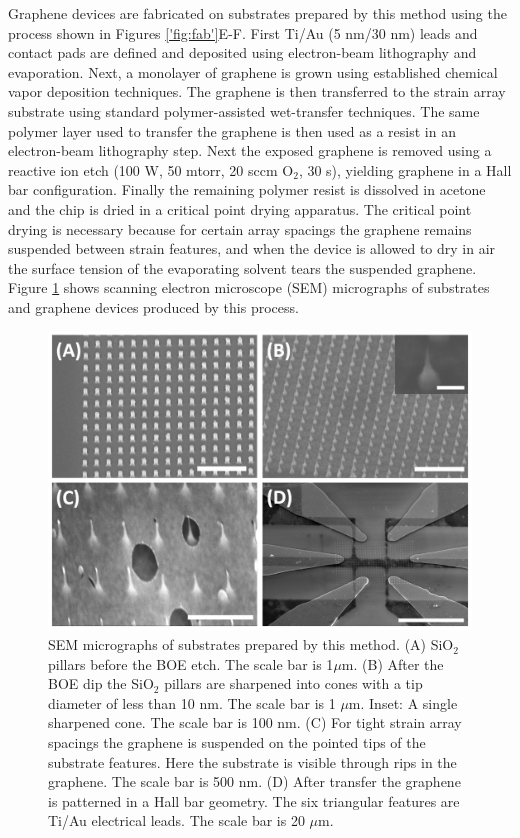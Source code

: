 \documentclass[edeposit,fullpage,draftthesis]{uiucthesis2009}
\begin{document}
            Graphene devices are fabricated on substrates prepared by this method using the process shown in Figures \ref{'fig:fab'}E-F. 
            First Ti/Au (5 nm/30 nm) leads and contact pads are defined and deposited using electron-beam lithography and evaporation. 
            Next, a monolayer of graphene is grown using established chemical vapor deposition techniques\cite{Li2009}. 
            The graphene is then transferred to the strain array substrate using standard polymer-assisted wet-transfer 
            techniques\cite{li2009transfer}. The same polymer layer used to transfer the graphene is then used as a 
            resist in an electron-beam lithography step. Next the exposed graphene is removed using a reactive ion etch 
            (100 W, 50 mtorr, 20 sccm O$_2$, 30 s), yielding graphene in a Hall bar configuration. Finally the remaining 
            polymer resist is dissolved in acetone and the chip is dried in a critical point drying apparatus. 
            The critical point drying is necessary because for certain array spacings the graphene remains suspended between
            strain features, and when the device is allowed to dry in air the surface tension 
            of the evaporating solvent tears the suspended graphene.
            Figure \ref{'fig:sem'} shows scanning electron microscope (SEM) micrographs of substrates and
            graphene devices produced by this process.
            
            \begin{figure}
            \centering
            \includegraphics[width=0.7\columnwidth]{images/resultsanddiscussion/strainarraypaper/Figure2}
            \caption{SEM micrographs of substrates prepared by this method. 
            (A) SiO$_2$ pillars before the BOE etch. The scale bar is 1$\mu$m.
            (B) After the BOE dip the SiO$_2$ pillars are sharpened into cones with a tip diameter of less than 10 nm.
            The scale bar is 1 $\mu$m. Inset: A single sharpened cone. The scale bar is 100 nm.
            (C) For tight strain array spacings the graphene is suspended on the pointed tips of the substrate features.
            Here the substrate is visible through rips in the graphene. The scale bar is 500 nm.
            (D) After transfer the graphene is patterned in a Hall bar geometry. The six triangular features are Ti/Au
            electrical leads. The scale bar is 20 $\mu$m.}
            \label{'fig:sem'}
            \end{figure}
            
\end{document}

